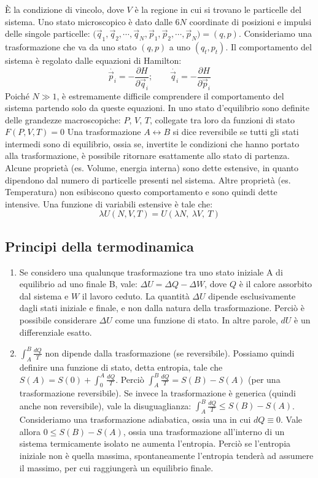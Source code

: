 \documentclass[../MeccanicaStatistica.tex]{subfiles}
\begin{document}
È la condizione di vincolo, dove $V$ è la regione in cui si trovano le particelle del sistema.
Uno stato microscopico è dato dalle $6N$ coordinate di posizioni e impulsi delle singole particelle:
${(\vec{q}}_1,{\vec{q}}_2,\cdots,{\vec{q}}_N,{\vec{p}}_1,{\vec{p}}_2,\cdots,{\vec{p}}_N)=(q,p)$.
Consideriamo una trasformazione che va da uno stato $(q,p)$ a uno $(q_t, p_t)$. Il comportamento del sistema è regolato dalle equazioni di Hamilton:
\[\dot{{\vec{p}}_i}=-\frac{\partial H}{\partial{\vec{q}}_i}; \quad \quad \dot{{\vec{q}}_i}=-\frac{\partial H}{\partial{\vec{p}}_i}\]
Poiché $N\gg1$, è estremamente difficile comprendere il comportamento del sistema partendo solo da queste equazioni.
In uno stato d'equilibrio sono definite delle grandezze macroscopiche: $P$, $V$, $T$, collegate tra loro da funzioni di stato $F\left(P,V,T\right)=0$
Una trasformazione $A\leftrightarrow B$ si dice reversibile se tutti gli stati intermedi sono di equilibrio, ossia se, invertite le condizioni che hanno portato alla trasformazione, è possibile ritornare esattamente allo stato di partenza.\\
Alcune proprietà (es. Volume, energia interna) sono dette estensive, in quanto dipendono dal numero di particelle presenti nel sistema. Altre proprietà (es. Temperatura) non esibiscono questo comportamento e sono quindi dette intensive.
Una funzione di variabili estensive è tale che:
\[ \lambda U\left(N,V,T\right)=U(\lambda N,\ \lambda V,\ T)\]

\subsection{Principi della termodinamica}
\begin{enumerate}
    \item Se considero una qualunque trasformazione tra uno stato iniziale A di equilibrio ad uno finale B, vale: $\Delta U=\Delta Q-\Delta W$, dove $Q$ è il calore assorbito dal sistema e $W$ il lavoro ceduto. La quantità $\Delta U$ dipende esclusivamente dagli stati iniziale e finale, e non dalla natura della trasformazione. Perciò è possibile considerare $\Delta U$ come una funzione di stato. In altre parole, $dU$ è un differenziale esatto.
	\item $\int_{A}^{B}\frac{dQ}{T}$ non dipende dalla trasformazione (se reversibile). Possiamo quindi definire una funzione di stato, detta entropia, tale che $S\left(A\right)=S\left(0\right)+\int_{0}^{A}\frac{dQ}{T}$.
	Perciò $\int_{A}^{B}{\frac{dQ}{T}=S\left(B\right)-S(A)}$ (per una trasformazione reversibile). Se invece la trasformazione è generica (quindi anche non reversibile), vale la disuguaglianza: $\int_{A}^{B}{\frac{dQ}{T}\le S\left(B\right)-S(A)}$.
	Consideriamo una trasformazione adiabatica, ossia una in cui $dQ\equiv0$. Vale allora $0\leq S\left(B\right)-S(A)$, ossia una trasformazione all'interno di un sistema termicamente isolato ne aumenta l'entropia. Perciò se l'entropia iniziale non è quella massima, spontaneamente l'entropia tenderà ad assumere il massimo, per cui raggiungerà un equilibrio finale. 
\end{enumerate}
\end{document}
